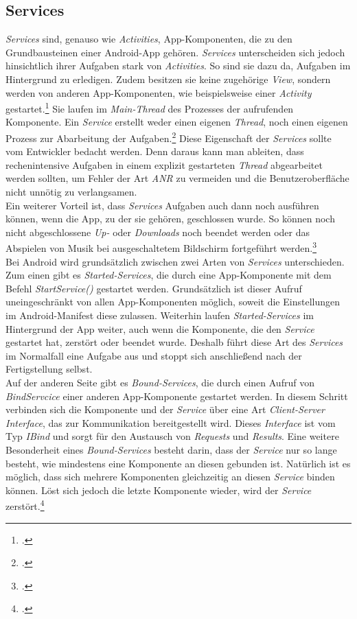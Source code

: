 \subsection{Services}
\label{ssec:android-services}
\textit{Services} sind, genauso wie \textit{Activities}, App-Komponenten, die zu den Grundbausteinen einer \gls{Android}-\gls{App} gehören. \textit{Services} unterscheiden sich jedoch hinsichtlich ihrer Aufgaben stark von \textit{Activities}. So sind sie dazu da, Aufgaben im Hintergrund zu erledigen. Zudem besitzen sie keine zugehörige \textit{View}, sondern werden von anderen \gls{App}-Komponenten, wie beispielsweise einer \textit{Activity} gestartet.\footcite[S. 163]{Android-BeckerPant} Sie laufen im \textit{Main-Thread} des Prozesses der aufrufenden Komponente. Ein \textit{Service} erstellt weder einen eigenen \textit{Thread}, noch einen eigenen Prozess zur Abarbeitung der Aufgaben.\footcite{Android-Services} Diese Eigenschaft der \textit{Services} sollte vom Entwickler bedacht werden. Denn daraus kann man ableiten, dass rechenintensive Aufgaben in einem explizit gestarteten \textit{Thread} abgearbeitet werden sollten, um Fehler der Art \textit{\ac{ANR}} zu vermeiden und die Benutzeroberfläche nicht unnötig zu verlangsamen.\\
Ein weiterer Vorteil ist, dass \textit{Services} Aufgaben auch dann noch ausführen können, wenn die \gls{App}, zu der sie gehören, geschlossen wurde. So können noch nicht abgeschlossene \textit{Up-} oder \textit{Downloads} noch beendet werden oder das Abspielen von Musik bei ausgeschaltetem Bildschirm fortgeführt werden.\footcite[S. 161f.]{Android-BeckerPant}\\
Bei Android wird grundsätzlich zwischen zwei Arten von \textit{Services} unterschieden. Zum einen gibt es \textit{Started-Services}, die durch eine App-Komponente mit dem Befehl \textit{StartService()} gestartet werden. Grundsätzlich ist dieser Aufruf uneingeschränkt von allen App-Komponenten möglich, soweit die Einstellungen im \gls{Android}-Manifest diese zulassen. Weiterhin laufen \textit{Started-Services} im Hintergrund der App weiter, auch wenn die Komponente, die den \textit{Service} gestartet hat, zerstört oder beendet wurde. Deshalb führt diese Art des \textit{Services} im Normalfall eine Aufgabe aus und stoppt sich anschließend nach der Fertigstellung selbst.\\
Auf der anderen Seite gibt es \textit{Bound-Services}, die durch einen Aufruf von \textit{BindServcice} einer anderen App-Komponente gestartet werden. In diesem Schritt verbinden sich die Komponente und der \textit{Service} über eine Art \textit{Client-Server Interface}, das zur Kommunikation bereitgestellt wird. Dieses \textit{Interface} ist vom Typ \textit{IBind} und sorgt für den Austausch von \textit{Requests} und \textit{Results}. Eine weitere Besonderheit eines \textit{Bound-Services} besteht darin, dass der \textit{Service} nur so lange besteht, wie mindestens eine Komponente an diesen gebunden ist. Natürlich ist es möglich, dass sich mehrere Komponenten gleichzeitig an diesen \textit{Service} binden können. Löst sich jedoch die letzte Komponente wieder, wird der \textit{Service} zerstört.\footcite{Android-Services} 

